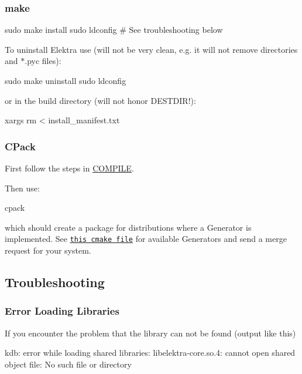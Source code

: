 \subsubsection*{make}


\begin{DoxyCode}
sudo make install
sudo ldconfig  # See troubleshooting below
\end{DoxyCode}


To uninstall Elektra use (will not be very clean, e.\+g. it will not remove directories and {\ttfamily $\ast$.pyc} files)\+:


\begin{DoxyCode}
sudo make uninstall
sudo ldconfig
\end{DoxyCode}


or in the build directory (will not honor {\ttfamily D\+E\+S\+T\+D\+IR}!)\+:


\begin{DoxyCode}
xargs rm < install\_manifest.txt
\end{DoxyCode}


\subsubsection*{C\+Pack}

First follow the steps in \hyperlink{doc_COMPILE_md}{C\+O\+M\+P\+I\+LE}.

Then use\+:


\begin{DoxyCode}
cpack
\end{DoxyCode}


which should create a package for distributions where a Generator is implemented. See \href{/home/markus/Projekte/Elektra/current/cmake/ElektraPackaging.cmake}{\tt this cmake file} for available Generators and send a merge request for your system.

\subsection*{Troubleshooting}

\subsubsection*{Error Loading Libraries}

If you encounter the problem that the library can not be found (output like this)


\begin{DoxyCode}
kdb: error while loading shared libraries:
     libelektra-core.so.4: cannot open shared object file: No such file or directory
\end{DoxyCode}


